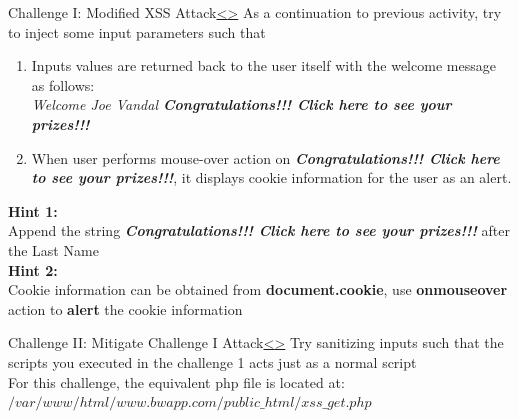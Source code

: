 \documentclass[12pt]{extarticle}
\newenvironment{instructionblock}{\Large\bgroup}{\egroup}
\begin{document}


\pagebreak
\begin{slide}{Challenge I: Modified XSS Attack}{\hyperref[slide 12]{\textless}\hyperref[slide 14]{\textgreater}}
	\vspace{2mm}
	\begin{instructionblock}
		As a continuation to previous activity, try to inject some input parameters such that
		\begin{enumerate}
			\item  Inputs values are returned back to the user itself with the welcome message as follows:\\
			\textit{Welcome Joe Vandal \textbf{Congratulations!!! Click here to see your prizes!!!}}
			\item When user performs mouse-over action on \textit{\textbf{Congratulations!!! Click here to see your prizes!!!}}, it displays cookie information for the user as an alert. 
		\end{enumerate}
	\end{instructionblock}
\end{slide}

\vspace{5mm}
\vfill
\noindent
\textbf{Hint 1:}\\
Append the string \textit{\textbf{Congratulations!!! Click here to see your prizes!!!}} after the Last Name\\
\noindent
\textbf{Hint 2:}\\
Cookie information can be obtained from \textbf{document.cookie}, use \textbf{onmouseover} action to \textbf{alert} the cookie information\\




\pagebreak
\begin{slide}{Challenge II: Mitigate Challenge I Attack}{\hyperref[slide 13]{\textless}\hyperref[slide 15]{\textgreater}}
	\vspace{2mm}
	\begin{instructionblock}
		Try sanitizing inputs such that the scripts you executed in the challenge 1 acts just as a normal script\\
		
		For this challenge, the equivalent php file is located at:
		\textit{$/var/www/html/www.bwapp.com/public\_html/xss\_get.php$}\\
		
	\end{instructionblock}
\end{slide}
\end{document}
